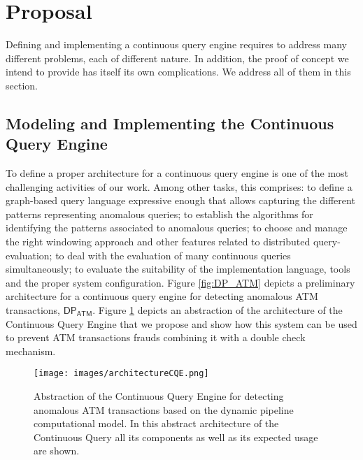 \newpage
\section{Proposal}
\label{sec:proposal}

Defining and implementing a continuous query engine requires to address many different problems, each of different nature. 
In addition, the proof of concept we intend to provide has itself its own complications.
We address all of them in this section.
%

\subsection{Modeling and Implementing the Continuous Query Engine}
To define a proper architecture for a continuous query engine is one of the most challenging activities of our work. Among other tasks, this comprises: to define a graph-based query language expressive enough that allows capturing the different patterns representing anomalous queries; to establish the algorithms for identifying the patterns associated to anomalous queries; to choose and manage the right windowing approach and other features related to distributed query-evaluation; to deal with the evaluation of many continuous queries simultaneously; to evaluate the suitability of the implementation language, tools and the proper system configuration. Figure \ref{fig:DP_ATM} depicts a preliminary architecture for a continuous query engine for detecting anomalous ATM transactions, $\mathsf{DP_{ATM}}$.
Figure \ref{fig:architecture-usage} depicts an abstraction of the architecture of the Continuous Query Engine that we propose and show how this system can be used to prevent ATM transactions frauds combining it with a double check mechanism. 
%
\begin{figure}[H]
         \centering
         \hspace*{-0.8cm}
         \texttt{[image: images/architectureCQE.png]}
         \caption{Abstraction of the Continuous Query Engine for detecting anomalous 
         ATM transactions based on the dynamic pipeline computational model. 
         In this abstract architecture of the Continuous Query  all its components as well as its expected usage are shown. }
         \label{fig:architecture-usage}
\end{figure}
%
